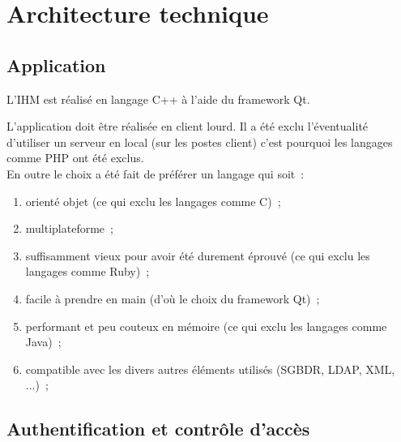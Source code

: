 \chapter{Architecture technique}\label{Architecture_technique}

\section{Application}
L'IHM est réalisé en langage C++ à l'aide du framework Qt.
\begin{notation}
L'application doit être réalisée en client lourd.
Il a été exclu l'éventualité d'utiliser un serveur en local (sur les postes client) c'est pourquoi les langages comme PHP ont été exclus.
\\
En outre le choix a été fait de préférer un langage qui soit~:
\begin{enumerate}
	\item orienté objet (ce qui exclu les langages comme C)~;
	\item multiplateforme~;
	\item suffisamment vieux pour avoir été durement éprouvé (ce qui exclu les langages comme Ruby)~;
	\item facile à prendre en main (d'où le choix du framework Qt)~;
	\item performant et peu couteux en mémoire (ce qui exclu les langages comme Java)~;
	\item compatible avec les divers autres éléments utilisés (SGBDR, LDAP, XML, ...)~;
\end{enumerate}
\end{notation}

\section{Authentification et contrôle d'accès}


\clearpage


\clearpage


\clearpage


\clearpage
